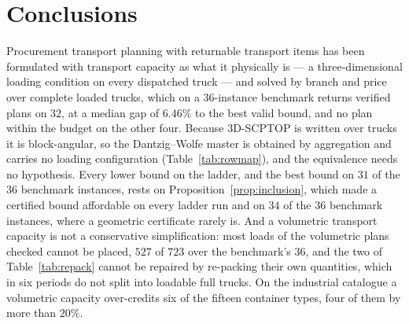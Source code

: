 \section{Conclusions}
\label{sec:conclusions}

Procurement transport planning with returnable transport items has
been formulated with transport capacity as what it physically is --- a
three-dimensional loading condition on every dispatched truck --- and
solved by branch and price over complete loaded trucks, which on a
36-instance benchmark returns verified plans on $32$, at a median gap
of $6.46\%$ to the best valid bound, and no plan within the budget on
the other four. Because
3D-SCPTOP is written over trucks it is block-angular, so the
Dantzig--Wolfe master is obtained by aggregation and carries no loading
configuration (Table~\ref{tab:rowmap}), and the equivalence needs no
hypothesis.
Every lower bound on the ladder, and the best bound on $31$ of the $36$
benchmark instances, rests on Proposition~\ref{prop:inclusion}, which
made a certified bound affordable on every ladder run and on $34$ of
the $36$ benchmark instances, where a geometric certificate rarely is.
And a
volumetric transport capacity is not a conservative simplification:
most loads of the volumetric plans checked cannot be placed, $527$ of
$723$ over the benchmark's $36$, and the two of
Table~\ref{tab:repack} cannot be repaired by re-packing their own
quantities, which in six periods do not split into loadable full
trucks. On the industrial catalogue a volumetric capacity over-credits
six of the fifteen container types, four of them by more than $20\%$.

